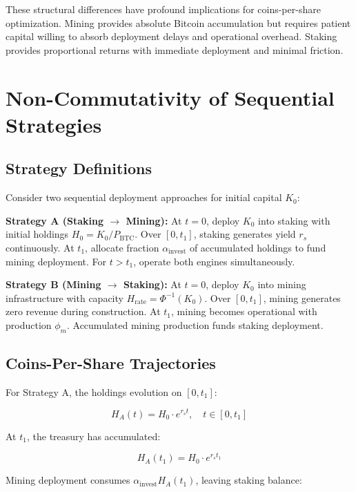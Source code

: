 \documentclass[
  journal=medium,
  manuscript=article-type,
  year=2025,
  volume=1,
]{cup-journal}
\theoremstyle{definition}
\begin{document}
These structural differences have profound implications for coins-per-share optimization. Mining provides absolute Bitcoin accumulation but requires patient capital willing to absorb deployment delays and operational overhead. Staking provides proportional returns with immediate deployment and minimal friction.

\section{Non-Commutativity of Sequential Strategies}

\subsection{Strategy Definitions}

Consider two sequential deployment approaches for initial capital $K_0$:

\textbf{Strategy A (Staking $\to$ Mining):} At $t = 0$, deploy $K_0$ into staking with initial holdings $H_0 = K_0 / P_{\text{BTC}}$. Over $[0, t_1]$, staking generates yield $r_s$ continuously. At $t_1$, allocate fraction $\alpha_{\text{invest}}$ of accumulated holdings to fund mining deployment. For $t > t_1$, operate both engines simultaneously.

\textbf{Strategy B (Mining $\to$ Staking):} At $t = 0$, deploy $K_0$ into mining infrastructure with capacity $H_{\text{rate}} = \Phi^{-1}(K_0)$. Over $[0, t_1]$, mining generates zero revenue during construction. At $t_1$, mining becomes operational with production $\phi_m$. Accumulated mining production funds staking deployment.

\subsection{Coins-Per-Share Trajectories}

For Strategy A, the holdings evolution on $[0, t_1]$:

\begin{equation}
H_A(t) = H_0 \cdot e^{r_s t}, \quad t \in [0, t_1]
\end{equation}

At $t_1$, the treasury has accumulated:

\begin{equation}
H_A(t_1) = H_0 \cdot e^{r_s t_1}
\end{equation}

Mining deployment consumes $\alpha_{\text{invest}} H_A(t_1)$, leaving staking balance:
\end{document}
